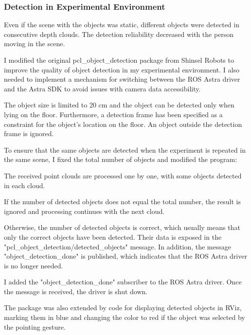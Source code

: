 \subsubsection{Detection in Experimental Environment}
Even if the scene with the objects was static, different objects were detected in consecutive depth clouds. The detection reliability decreased with the person moving in the scene.\par
I modified the original pcl\_object\_detection package from Shinsel Robots to improve the quality of object detection in my experimental environment. I also needed to implement a mechanism for switching between the ROS Astra driver and the Astra SDK to avoid issues with camera data accessibility.\par
The object size is limited to 20 cm and the object can be detected only when lying on the floor. Furthermore, a detection frame has been specified as a constraint for the object's location on the floor. An object outside the detection frame is ignored.\par
To ensure that the same objects are detected when the experiment is repeated in the same scene, I fixed the total number of objects and modified the program:\par
The received point clouds are processed one by one, with some objects detected in each cloud. \par
If the number of detected objects does not equal the total number, the result is ignored and processing continues with the next cloud.\par
Otherwise, the number of detected objects is correct, which usually means that only the correct objects have been detected. Their data is exposed in the "pcl\_object\_detection/detected\_objects" message. In addition, the message "object\_detection\_done" is published, which indicates that the ROS Astra driver is no longer needed.\par 
I added the "object\_detection\_done" subscriber to the ROS Astra driver. Once the message is received, the driver is shut down.\par

The package was also extended by code for displaying detected objects in RViz, marking them in blue and changing the color to red if the object was selected by the  pointing gesture.\par

